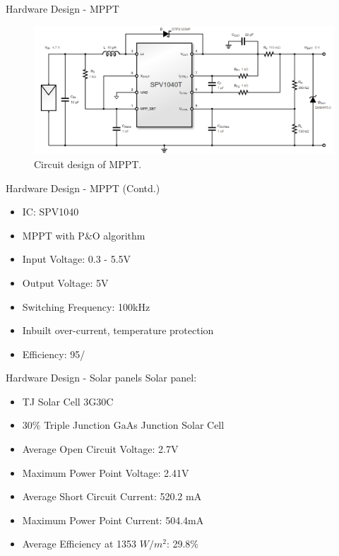 \documentclass[aspectratio=169]{beamer}
\begin{document}
	
	\begin{frame}{Hardware Design - MPPT }
		\begin{figure}[h]
			\centering
			\includegraphics[width=1\textwidth]{diag/MPPT.png}
			\caption{Circuit design of MPPT.}
			\label{fig:mesh1}
		\end{figure}
	\end{frame}

	\begin{frame}{Hardware Design - MPPT (Contd.)}
	\begin{itemize}
	\item IC: SPV1040
	\item MPPT with P\&O algorithm	
	\item Input Voltage: 0.3 - 5.5V
	\item Output Voltage: 5V
	\item Switching Frequency: 100kHz
	\item Inbuilt over-current, temperature protection
	\item Efficiency: 95/%
\end{itemize}
\end{frame}


	\begin{frame}{Hardware Design - Solar panels}
		Solar panel:
			\begin{itemize}
			\item TJ Solar Cell 3G30C 
			\item 30$\%$ Triple Junction GaAs Junction Solar Cell
			\item Average Open Circuit Voltage: 2.7V
			\item Maximum Power Point Voltage: 2.41V
			\item Average Short Circuit Current: 520.2 mA
			\item Maximum Power Point Current: 504.4mA
			\item Average Efficiency at 1353 $W/m^{2}$: 29.8$\%$

		\end{itemize}
	\end{frame}
	
\end{document}
